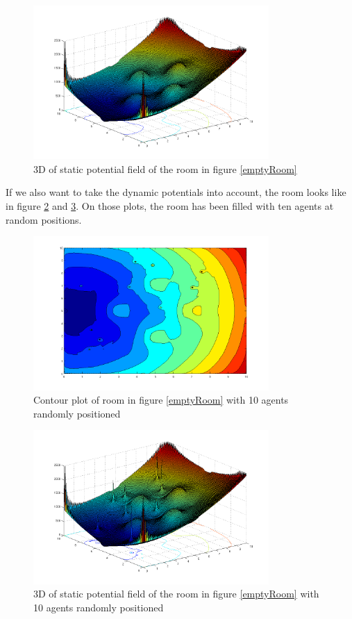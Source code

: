 \begin{figure}
	\centering
	\includegraphics[width=0.8\textwidth]{../graphen/3DPotential.png}
	\caption{3D of static potential field of the room in figure
	\ref{emptyRoom}}
	\label{3D}
\end{figure}

If we also want to take the dynamic potentials into account, the room looks
like in figure \ref{10agentsContour} and \ref{10agents3D}. On those plots, the
room has been filled with ten agents at random positions.
\begin{figure}
	\centering
	\includegraphics[width=0.8\textwidth]{../graphen/10agentsContour.png}
	\caption{Contour plot of room in figure \ref{emptyRoom} with 10 agents randomly positioned}
	\label{10agentsContour}
\end{figure}
\begin{figure}
	\centering
	\includegraphics[width=0.8\textwidth]{../graphen/10agents3DPotential.png}
	\caption{3D of static potential field of the room in figure
	\ref{emptyRoom} with 10 agents randomly positioned}
	\label{10agents3D}
\end{figure}
